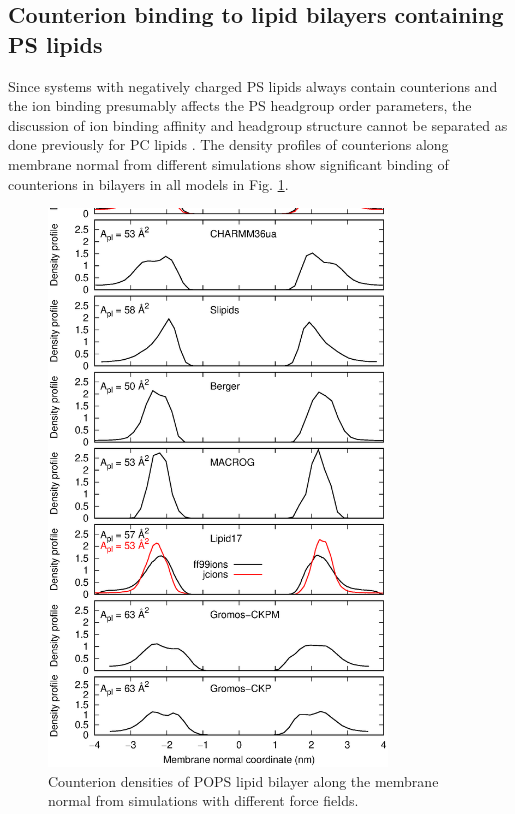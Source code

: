 \documentclass[aps,prl,superscriptaddress,twocolumn]{revtex4}
\begin{document}
%


\subsection{Counterion binding to lipid bilayers containing PS lipids}
Since systems with negatively charged PS lipids always contain counterions
and the ion binding presumably affects the PS headgroup
order parameters, the discussion of ion binding affinity and
headgroup structure cannot be separated as done previously
for PC lipids \cite{botan15,catte16}. The density profiles
of counterions along membrane normal from different simulations
show significant binding of counterions in bilayers in all
models in Fig. \ref{NAdensPOPS}.
\begin{figure}[]
  \centering
  \includegraphics[width=9.0cm]{../Figs/NAdensPOPS.eps}
  \caption{\label{NAdensPOPS}
    Counterion densities of POPS lipid bilayer along the membrane normal from
    simulations with different force fields.
  }
\end{figure}
\end{document}
